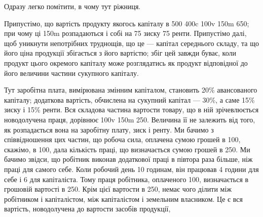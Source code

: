 Одразу легко помітити, в чому тут ріжниця.

Припустімо, що вартість продукту якогось капіталу в 500 \deq{} 400c \dplus{}
100v \dplus{} 150m \deq{} 650; при чому ці 150m розпадаються і собі на 75 зиску \dplus{}
75 ренти. Припустімо далі, щоб уникнути непотрібних труднощів, що це —
капітал середнього складу, та що його ціна продукції збігається з його вартістю;
збіг цей завжди буває, коли продукт цього окремого капіталу може розглядатись
як продукт відповідної до його величини частини сукупного капіталу.

Тут заробітна плата, вимірювана змінним капіталом, становить 20\% авансованого
капіталу; додаткова вартість, обчислена на сукупний капітал — 30\%,
а саме 15\% зиску і 15\% ренти. Вся складова частина вартости товару, що
в ній зрічевлюється новодолучена праця, дорівнює 100v \dplus{} 150m \deq{} 250. Величина
її не залежить від того, як розпадається вона на заробітну плату, зиск і ренту.
Ми бачимо з співвідношення цих частин, що робоча сила, оплачена сумою
грошей в 100, скажімо, в 100, дала кількість праці, що визначається
сумою грошей в 250. Ми бачимо звідси, що робітник
виконав додаткової праці в півтора раза більше, ніж праці для самого себе.
Коли робочий день \deq{} 10 годинам, він працював 4 години для себе і 6 для
капіталіста. Тому праця робітника, оплаченого 100, визначається
в грошовій вартості в 250. Крім цієї вартости в 250,
немає чого ділити між робітником і капіталістом, між капіталістом і земельним
власником. Це є вся вартість, новодолучена до вартости засобів продукції,
\parbreak{}  %
